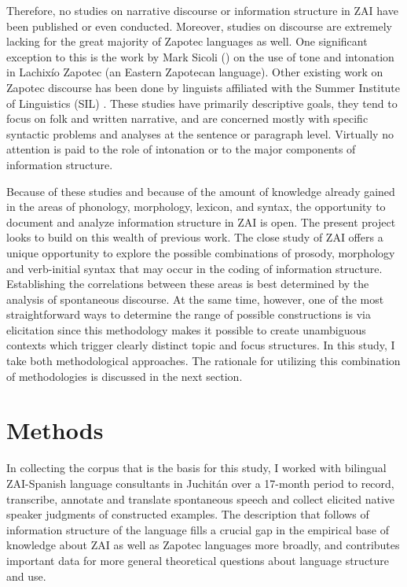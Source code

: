 Therefore, no studies on narrative discourse or information structure in ZAI have been published or even conducted. Moreover, studies on discourse are extremely lacking for the great majority of Zapotec languages as well. One significant exception to this is the work by Mark Sicoli (\citealt{sicoli2007,sicoli2010}) on the use of tone and intonation in Lachix\'{i}o Zapotec (an Eastern Zapotecan language). Other existing work on Zapotec discourse has been done by linguists affiliated with the Summer Institute of Linguistics (SIL)  \citep{persons1979,long1985,benton1987,benton1997,kreikebaum1987,riggs1987,ward1987,piper1995,heise2003,riggs2010}. These studies have primarily descriptive goals, they tend to focus on folk and written narrative, and are concerned mostly with specific syntactic problems and analyses at the sentence or paragraph level. Virtually no attention is paid to the role of intonation or to the major components of information structure.

Because of these studies and because of the amount of knowledge already gained in the areas of phonology, morphology, lexicon, and syntax, the opportunity to document and analyze information structure in ZAI is open. The present project looks to build on this wealth of previous work. The close study of ZAI offers a unique opportunity to explore the possible combinations of prosody, morphology and verb-initial syntax that may occur in the coding of information structure. Establishing the correlations between these areas is best determined by the analysis of spontaneous discourse. At the same time, however, one of the most straightforward ways to determine the range of possible constructions is via elicitation since this methodology makes it possible to create unambiguous contexts which trigger clearly distinct topic and focus structures. In this study, I take both methodological approaches. The rationale for utilizing this combination of methodologies is discussed in the next section.


\section{Methods}

In collecting the corpus that is the basis for this study, I worked with bilingual ZAI-Spanish language consultants in Juchit\'{a}n over a 17-month period to record, transcribe, annotate and translate spontaneous speech and collect elicited native speaker judgments of constructed examples. The description that follows of information structure of the language fills a crucial gap in the empirical base of knowledge about ZAI as well as Zapotec languages more broadly, and contributes important data for more general theoretical questions about language structure and use.

